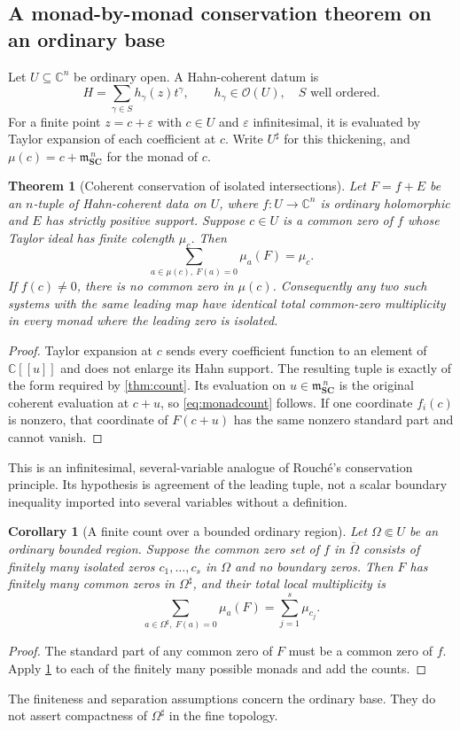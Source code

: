 \documentclass[11pt,letterpaper]{article}
\newtheorem{theorem}{Theorem}[section]
\newtheorem{corollary}[corollary]{Corollary}
\theoremstyle{definition}
\theoremstyle{remark}
\newcommand{\SC}{\mathbf{SC}}
\newcommand{\C}{\mathbb C}
\newcommand{\OO}{\mathcal O}
\newcommand{\mm}{\mathfrak m}
\newcommand{\sh}{^{\sharp}}
\numberwithin{equation}{section}
\begin{document}
\subsection{A monad-by-monad conservation theorem on an ordinary base}
Let $U\subseteq\C^n$ be ordinary open. A Hahn-coherent datum is
\[
 H=\sum_{\gamma\in S}h_\gamma(z)t^\gamma,
 \qquad h_\gamma\in\OO(U),\quad S\text{ well ordered}.
\]
For a finite point $z=c+\varepsilon$ with $c\in U$ and $\varepsilon$ infinitesimal, it is evaluated by Taylor expansion of each coefficient at $c$. Write $U\sh$ for this thickening, and $\mu(c)=c+\mm_{\SC}^{\,n}$ for the monad of $c$.

\begin{theorem}[Coherent conservation of isolated intersections]\label{thm:rouche}
Let $F=f+E$ be an $n$-tuple of Hahn-coherent data on $U$, where $f:U\to\C^n$ is ordinary holomorphic and $E$ has strictly positive support. Suppose $c\in U$ is a common zero of $f$ whose Taylor ideal has finite colength $\mu_c$. Then
\begin{equation}\label{eq:monadcount}
 \sum_{a\in\mu(c),\ F(a)=0}\mu_a(F)=\mu_c.
\end{equation}
If $f(c)\ne0$, there is no common zero in $\mu(c)$. Consequently any two such systems with the same leading map have identical total common-zero multiplicity in every monad where the leading zero is isolated.
\end{theorem}
\begin{proof}
Taylor expansion at $c$ sends every coefficient function to an element of $\C[[u]]$ and does not enlarge its Hahn support. The resulting tuple is exactly of the form required by \cref{thm:count}. Its evaluation on $u\in\mm_{\SC}^{\,n}$ is the original coherent evaluation at $c+u$, so \eqref{eq:monadcount} follows. If one coordinate $f_i(c)$ is nonzero, that coordinate of $F(c+u)$ has the same nonzero standard part and cannot vanish.
\end{proof}
This is an infinitesimal, several-variable analogue of Rouch\'e's conservation principle. Its hypothesis is agreement of the leading tuple, not a scalar boundary inequality imported into several variables without a definition.

\begin{corollary}[A finite count over a bounded ordinary region]\label{cor:compact}
Let $\Omega\Subset U$ be an ordinary bounded region. Suppose the common zero set of $f$ in $\overline\Omega$ consists of finitely many isolated zeros $c_1,\ldots,c_s$ in $\Omega$ and no boundary zeros. Then $F$ has finitely many common zeros in $\Omega\sh$, and their total local multiplicity is
\[
 \sum_{a\in\Omega\sh,\ F(a)=0}\mu_a(F)
 =\sum_{j=1}^s\mu_{c_j}.
\]
\end{corollary}
\begin{proof}
The standard part of any common zero of $F$ must be a common zero of $f$. Apply \cref{thm:rouche} to each of the finitely many possible monads and add the counts.
\end{proof}
The finiteness and separation assumptions concern the ordinary base. They do not assert compactness of $\Omega\sh$ in the fine topology.
\end{document}
